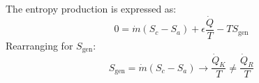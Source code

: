 The entropy production is expressed as:  
\[
0 = \dot{m}(S_c - S_a) + \epsilon \frac{\dot{Q}}{T} - T S_{\text{gen}}
\]  
Rearranging for \( S_{\text{gen}} \):  
\[
S_{\text{gen}} = \dot{m}(S_c - S_a) \to \frac{\dot{Q}_K}{T} \neq \frac{\dot{Q}_R}{T}
\]